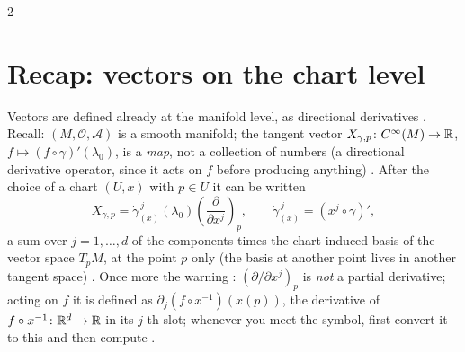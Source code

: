 \begin{paracol}{2}
\section{Recap: vectors on the chart level}\label{sec:tf-recap}

Vectors are defined already at the manifold level, as directional derivatives . Recall:
$(M,\mathcal O,\mathcal A)$ is a smooth manifold; the tangent vector $X_{\gamma,p}\colon C^\infty(M)\to\mathbb{R}$,
$f\mapsto(f\circ\gamma)'(\lambda_0)$, is a \emph{map}, not a collection of numbers (a directional derivative operator, since it
acts on $f$ before producing anything) .
After the choice of a chart $(U,x)$ with $p\in U$ it can be written
\[
  X_{\gamma,p}=\dot\gamma^{\,j}_{(x)}(\lambda_0)\left(\frac{\partial}{\partial x^j}\right)_{\!p},
  \qquad \dot\gamma^{\,j}_{(x)}=(x^j\circ\gamma)',
\]
a sum over $j=1,\dots,d$ of the components times the chart-induced basis of the vector space $T_pM$, at the point $p$ only
(the basis at another point lives in another tangent space) .
Once more the warning : $(\partial/\partial x^j)_p$ is \emph{not} a partial derivative; acting on $f$ it is
defined as $\partial_j(f\circ x^{-1})(x(p))$, the derivative of $f\circ x^{-1}\colon\mathbb{R}^d\to\mathbb{R}$ in its $j$-th slot; whenever you
meet the symbol, first convert it to this and then compute .


\end{paracol}
